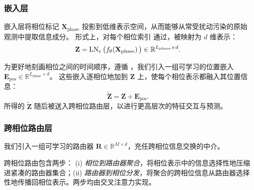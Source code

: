 \subsubsection{嵌入层}
嵌入层将相位标记 $\mathbf{X}_{\text{phase}}$ 投影到低维表示空间，从而能够从常受扰动污染的原始观测中提取信息成分。
形式上，对每个相位索引 通过，被映射为 $d$ 维表示：
\begin{equation}
\mathbf{Z}
= \operatorname{LN}_e\big(f_{\theta}\!\left(\mathbf{X}_{\text{phase}}\right)\big)\in \mathbb{R}^{L_{\text{phase}}\times d}.
\end{equation}

为更好地刻画相位之间的时间顺序，遵循 \cite{liu2023spatio}，我们引入一组可学习的位置嵌入 $\mathbf{E}_{\text{pos}}\in\mathbb{R}^{L_{\text{phase}}\times d}$。
这些嵌入逐相位地加到 $\mathbf{Z}$ 上，使每个相位表示都融入其位置信息：
\begin{equation}
\tilde{\mathbf{Z}}=\mathbf{Z}+\mathbf{E}_{\text{pos}}.
\end{equation}
所得的 $\tilde{\mathbf{Z}}$ 随后被送入跨相位路由层，以进行更高层次的特征交互与预测。

\subsubsection{跨相位路由层}

我们引入一组可学习的路由器 $\mathbf{R}\in\mathbb{R}^{M\times d}$，充任跨相位信息交换的中介。

跨相位路由包含两步：
(i) \emph{相位到路由器聚合}，将相位表示中的信息选择性地压缩进紧凑的路由器集合；(ii) \emph{路由器到相位分发}，将聚合的跨相位信息从路由器选择性地传播回相位表示。两步均由交叉注意力实现。

